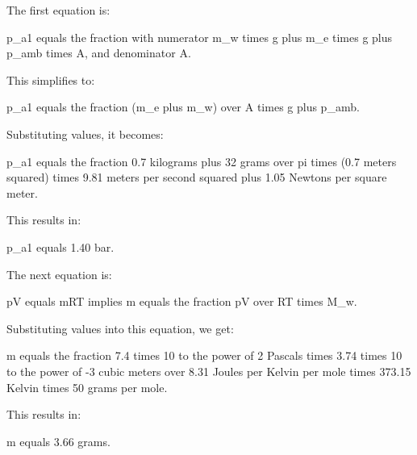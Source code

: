 The first equation is:

p_a1 equals the fraction with numerator m_w times g plus m_e times g plus p_amb times A, and denominator A.

This simplifies to:

p_a1 equals the fraction (m_e plus m_w) over A times g plus p_amb.

Substituting values, it becomes:

p_a1 equals the fraction 0.7 kilograms plus 32 grams over pi times (0.7 meters squared) times 9.81 meters per second squared plus 1.05 Newtons per square meter.

This results in:

p_a1 equals 1.40 bar.

The next equation is:

pV equals mRT implies m equals the fraction pV over RT times M_w.

Substituting values into this equation, we get:

m equals the fraction 7.4 times 10 to the power of 2 Pascals times 3.74 times 10 to the power of -3 cubic meters over 8.31 Joules per Kelvin per mole times 373.15 Kelvin times 50 grams per mole.

This results in:

m equals 3.66 grams.